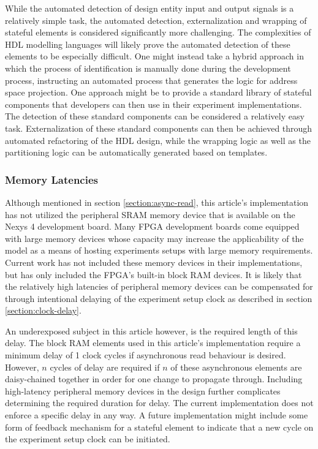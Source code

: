 \documentclass{article}
\begin{document}
While the automated detection of design entity input and output signals is a relatively simple task, the automated detection, externalization and wrapping of stateful elements is considered significantly more challenging. The complexities of HDL modelling languages will likely prove the automated detection of these elements to be especially difficult. One might instead take a hybrid approach in which the process of identification is manually done during the development process, instructing an automated process that generates the logic for address space projection. One approach might be to provide a standard library of stateful components that developers can then use in their experiment implementations. The detection of these standard components can be considered a relatively easy task. Externalization of these standard components can then be achieved through automated refactoring of the HDL design, while the wrapping logic as well as the partitioning logic can be automatically generated based on templates.

\subsubsection{Memory Latencies}
Although mentioned in section \ref{section:async-read}, this article's implementation has not utilized the peripheral SRAM memory device that is available on the Nexys 4 development board. Many FPGA development boards come equipped with large memory devices whose capacity may increase the applicability of the model as a means of hosting experiments setups with large memory requirements. Current work has not included these memory devices in their implementations, but has only included the FPGA's built-in block RAM devices. It is likely that the relatively high latencies of peripheral memory devices can be compensated for through intentional delaying of the experiment setup clock as described in section \ref{section:clock-delay}. 

An underexposed subject in this article however, is the required length of this delay. The block RAM elements used in this article's implementation require a minimum delay of 1 clock cycles if asynchronous read behaviour is desired. However, $n$ cycles of delay are required if $n$ of these asynchronous elements are daisy-chained together in order for one change to propagate through. Including high-latency peripheral memory devices in the design further complicates determining the required duration for delay. The current implementation does not enforce a specific delay in any way. A future implementation might include some form of feedback mechanism for a stateful element to indicate that a new cycle on the experiment setup clock can be initiated. 
\end{document}
